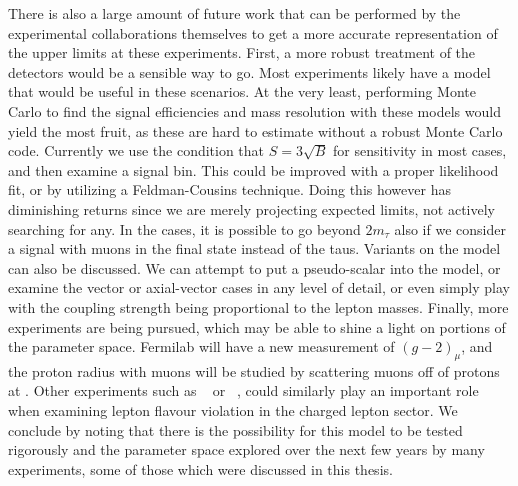 There is also a large amount of future work that can be performed by the experimental collaborations themselves to get a more accurate representation of the upper limits at these experiments.
First, a more robust treatment of the detectors would be a sensible way to go.
Most experiments likely have a \geant model that would be useful in these scenarios.
At the very least, performing Monte Carlo to find the signal efficiencies and mass resolution with these models would yield the most fruit, as these are hard to estimate without a robust Monte Carlo code.
Currently we use the condition that $S = 3\sqrt{B}$ for sensitivity in most cases, and then examine a signal bin.
This could be improved with a proper likelihood fit, or by utilizing a Feldman-Cousins technique.
Doing this however has diminishing returns since we are merely projecting expected limits, not actively searching for any.
In the \belletwo cases, it is possible to go beyond $2m_\tau$ also if we consider a signal with muons in the final state instead of the taus.
Variants on the model can also be discussed.
We can attempt to put a pseudo-scalar into the model, or examine the vector or axial-vector cases in any level of detail, or even simply play with the coupling strength being proportional to the lepton masses.
Finally, more experiments are being pursued, which may be able to shine a light on portions of the parameter space.
Fermilab will have a new measurement of $(g-2)_\mu$, and the proton radius with muons will be studied by scattering muons off of protons at \muse.
Other experiments such as \mutoe~\cite{Abrams:2012er} or \comet~\cite{Cui:2009zz}, could similarly play an important role when examining lepton flavour violation in the charged lepton sector.
We conclude by noting that there is the possibility for this model to be tested rigorously and the parameter space explored over the next few years by many experiments, some of those which were discussed in this thesis.
